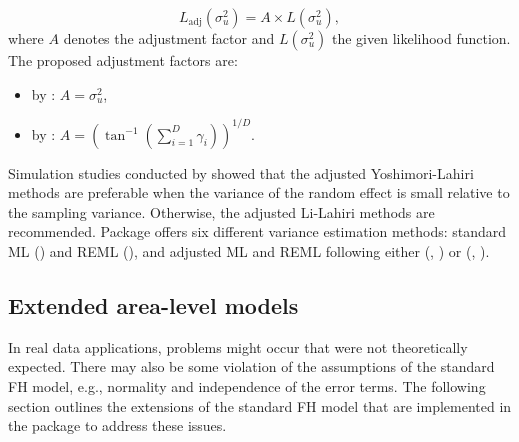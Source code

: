 %
\begin{equation*}
L_{\text{adj}}\left(\sigma_u^{2}\right) = A \times L\left(\sigma_u^{2}\right),
\end{equation*}
%
where $A$ denotes the adjustment factor and $L(\sigma_u^{2})$ the given
likelihood function. The proposed adjustment factors are:
\begin{itemize}
	\item by \citet{Li2010}: $A = \sigma_u^{2}$,
	\item by \citet{Yoshimori2014}: $ A = \left( \tan^{-1} \left(\sum\limits_{i=1}^{D}
	\gamma_i \right)\right)^{1/D} $.
\end{itemize}
Simulation studies conducted by \citet{Yoshimori2014} showed that the adjusted
Yoshimori-Lahiri methods are preferable when the variance of the random
effect is small relative to the sampling variance. Otherwise, the adjusted
Li-Lahiri methods are recommended. Package  offers six different
variance estimation methods: standard ML () and REML (),
and adjusted ML and REML following either \citet{Li2010} (, ) or \citet{Yoshimori2014} (, ).

\subsection{Extended area-level models} \label{subsec:extfh}
In real data applications, problems might occur that were not theoretically expected. There may also be some violation of the assumptions of the standard FH model, e.g., normality and independence of the error terms. The following section outlines the extensions of the standard FH model that are implemented in the package  to address these issues. \\

